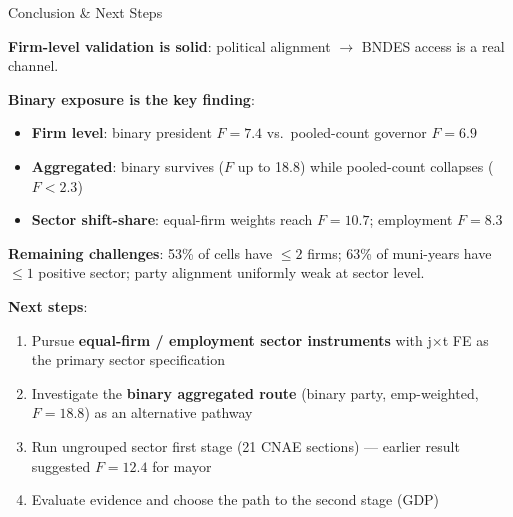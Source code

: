 \documentclass[aspectratio=169,11pt]{beamer}
\begin{document}
\begin{frame}{Conclusion \& Next Steps}

\textbf{Firm-level validation is solid}: political alignment $\to$ BNDES access is a real channel.

\bigskip

\textbf{Binary exposure is the key finding}:
\begin{itemize}
    \item \textbf{Firm level}: binary president $F = 7.4$ vs.\ pooled-count governor $F = 6.9$
    \item \textbf{Aggregated}: binary survives ($F$ up to 18.8) while pooled-count collapses ($F < 2.3$)
    \item \textbf{Sector shift-share}: equal-firm weights reach $F = 10.7$; employment $F = 8.3$
\end{itemize}

\bigskip

\textbf{Remaining challenges}: 53\% of cells have $\leq 2$ firms; 63\% of muni-years have $\leq 1$ positive sector; party alignment uniformly weak at sector level.

\bigskip

\textbf{Next steps}:
\begin{enumerate}
    \item Pursue \textbf{equal-firm / employment sector instruments} with j$\times$t FE as the primary sector specification
    \item Investigate the \textbf{binary aggregated route} (binary party, emp-weighted, $F = 18.8$) as an alternative pathway
    \item Run ungrouped sector first stage (21 CNAE sections) --- earlier result suggested $F = 12.4$ for mayor
    \item Evaluate evidence and choose the path to the second stage (GDP)
\end{enumerate}

\end{frame}

\appendix
\end{document}
